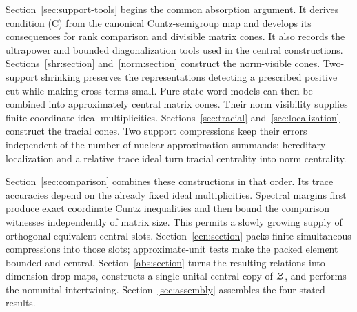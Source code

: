Section~\ref{sec:support-tools} begins the common absorption argument.
It derives condition \textup{(C)} from the canonical Cuntz-semigroup
map and develops its consequences for rank comparison and divisible
matrix cones. It also records the ultrapower and bounded
diagonalization tools used in the central constructions.
Sections~\ref{shr:section} and~\ref{norm:section} construct the
norm-visible cones. Two-support shrinking preserves the
representations detecting a prescribed positive cut while making
cross terms small. Pure-state word models can then be combined into
approximately central matrix cones. Their norm visibility supplies
finite coordinate ideal multiplicities.
Sections~\ref{sec:tracial} and~\ref{sec:localization} construct the
tracial cones. Two support compressions keep their errors independent
of the number of nuclear approximation summands; hereditary
localization and a relative trace ideal turn tracial centrality into
norm centrality.

Section~\ref{sec:comparison} combines these constructions in that
order. Its trace accuracies depend on the already fixed ideal
multiplicities. Spectral margins first produce exact coordinate
Cuntz inequalities and then bound the comparison witnesses
independently of matrix size. This permits a slowly growing supply
of orthogonal equivalent central slots.
Section~\ref{cen:section} packs finite simultaneous compressions
into those slots; approximate-unit tests make the packed element
bounded and central. Section~\ref{abs:section} turns the resulting
relations into dimension-drop maps, constructs a single unital
central copy of $\mathcal Z$, and performs the nonunital intertwining.
Section~\ref{sec:assembly} assembles the four stated results.
